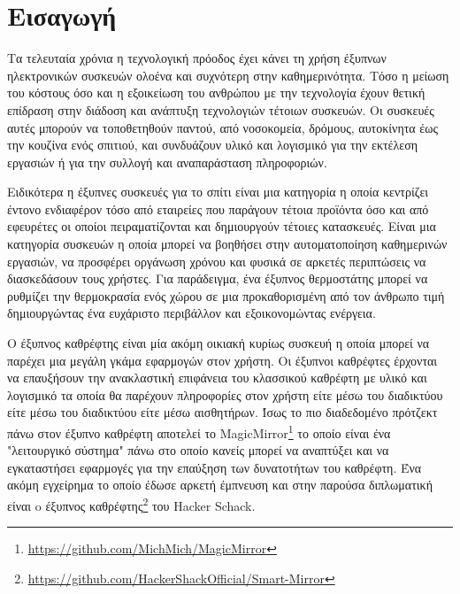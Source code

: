 \chapter{Εισαγωγή}
\label{chapter:intro}

\setlength{\parskip}{1em}
Τα τελευταία χρόνια η τεχνολογική πρόοδος έχει κάνει τη χρήση έξυπνων ηλεκτρονικών συσκευών ολοένα και συχνότερη στην καθημερινότητα. Τόσο η μείωση του κόστους όσο και η εξοικείωση του ανθρώπου με την τεχνολογία έχουν θετική επίδραση στην διάδοση και ανάπτυξη τεχνολογιών τέτοιων συσκευών. Οι συσκευές αυτές μπορούν να τοποθετηθούν παντού, από νοσοκομεία, δρόμους, αυτοκίνητα έως την κουζίνα ενός σπιτιού, και συνδυάζουν υλικό και λογισμικό για την εκτέλεση εργασιών ή για την συλλογή και αναπαράσταση πληροφοριών.

Ειδικότερα η έξυπνες συσκευές για το σπίτι είναι μια κατηγορία η οποία κεντρίζει έντονο ενδιαφέρον τόσο από εταιρείες που παράγουν τέτοια προϊόντα όσο και από εφευρέτες οι οποίοι πειραματίζονται και δημιουργούν τέτοιες κατασκευές. Είναι μια κατηγορία συσκευών η οποία μπορεί να βοηθήσει στην αυτοματοποίηση καθημερινών εργασιών, να προσφέρει οργάνωση χρόνου και φυσικά σε αρκετές περιπτώσεις να διασκεδάσουν τους χρήστες. Για παράδειγμα, ένα έξυπνος θερμοστάτης μπορεί να ρυθμίζει την θερμοκρασία ενός χώρου σε μια προκαθορισμένη από τον άνθρωπο τιμή δημιουργώντας ένα ευχάριστο περιβάλλον και εξοικονομώντας ενέργεια.

Ο έξυπνος καθρέφτης είναι μία ακόμη οικιακή κυρίως συσκευή η οποία μπορεί να παρέχει μια μεγάλη γκάμα εφαρμογών στον χρήστη. Οι έξυπνοι καθρέφτες έρχονται να επαυξήσουν την ανακλαστική επιφάνεια του κλασσικού καθρέφτη με υλικό και λογισμικό τα οποία θα παρέχουν πληροφορίες στον χρήστη είτε μέσω του διαδικτύου είτε μέσω του διαδικτύου είτε μέσω αισθητήρων. Ίσως το πιο διαδεδομένο πρότζεκτ πάνω στον έξυπνο καθρέφτη αποτελεί το MagicMirror\footnote{\href{https://github.com/MichMich/MagicMirror}{https://github.com/MichMich/MagicMirror}} το οποίο είναι ένα "λειτουργικό σύστημα" πάνω στο οποίο κανείς μπορεί να αναπτύξει και να εγκαταστήσει εφαρμογές για την επαύξηση των δυνατοτήτων του καθρέφτη. Ένα ακόμη εγχείρημα το οποίο έδωσε αρκετή έμπνευση και στην παρούσα διπλωματική είναι o έξυπνος καθρέφτης\footnote{\href{https://github.com/HackerShackOfficial/Smart-Mirror}{https://github.com/HackerShackOfficial/Smart-Mirror}} του Hacker Schack.






